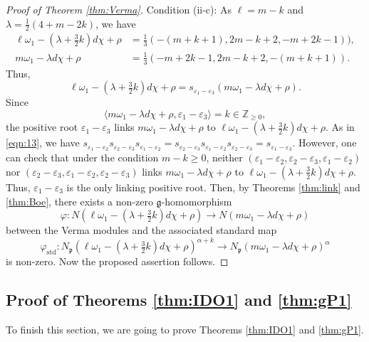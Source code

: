 \documentclass[reqno,11pt]{amsart}
\theoremstyle{remark}
\numberwithin{equation}{section}
\newcommand{\ga}{\alpha}
\newcommand{\eps}{\varepsilon}
\newcommand{\fg}{{\mathfrak g}}
\newcommand{\fp}{{\mathfrak p}}
\newcommand{\Z}{\mathbb{Z}}
\newcommand{\IP}[2]{\langle#1 , #2\rangle}     %
\newcommand{\std}{\mathrm{std}}
\begin{document}
\begin{proof}[Proof of Theorem \ref{thm:Verma}]
\noindent 
Condition (ii-c):
As
$\ell=m-k$ and $\lambda = \tfrac{1}{2}(4+m-2k)$,
we have
\begin{align*}
\ell\omega_1 -(\lambda +\tfrac{3}{2}k)d\chi+\rho 
&=
\tfrac{1}{3}(-(m+k+1), 2m-k+2, -m+2k-1)),\\
m\omega_1 -\lambda d\chi+\rho
&=\tfrac{1}{3}(-m+2k-1, 2m-k+2, -(m+k+1)).
\end{align*}
Thus,
\begin{equation*}
\ell\omega_1 -(\lambda +\tfrac{3}{2}k)d\chi+\rho 
=s_{\eps_1-\eps_3}(m\omega_1 -\lambda d\chi+\rho).
\end{equation*}
Since
\begin{equation*}
\IP{m\omega_1 -\lambda d\chi+\rho}{\eps_1-\eps_3}
=k \in \Z_{\geq 0},
\end{equation*}
the positive root $\eps_1-\eps_3$ links 
$m\omega_1 -\lambda d\chi+\rho$ to 
$\ell\omega_1 -(\lambda +\tfrac{3}{2}k)d\chi+\rho$.
As in \eqref{eqn:13},
we have 
$s_{\eps_1-\eps_2}s_{\eps_2-\eps_3}s_{\eps_1-\eps_2}
=s_{\eps_2-\eps_3}s_{\eps_1-\eps_2}s_{\eps_2-\eps_3}
=s_{\eps_1-\eps_3}$. However, one can check that under the condition $m-k \geq 0$,
neither $(\eps_1-\eps_2, \eps_2-\eps_3, \eps_1-\eps_2)$ nor 
$(\eps_2-\eps_3, \eps_1-\eps_2, \eps_2-\eps_3)$ links 
$m\omega_1 -\lambda d\chi+\rho$ to 
$\ell\omega_1 -(\lambda +\tfrac{3}{2}k)d\chi+\rho$.
Thus, $\eps_1-\eps_3$ is the only linking positive root.
Then, by Theorems \ref{thm:link} and \ref{thm:Boe}, 
there exists a non-zero $\fg$-homomorphism
\begin{equation*}
\varphi\colon
N(\ell\omega_1 -(\lambda +\tfrac{3}{2}k)d\chi+\rho)
\to
N(m\omega_1 -\lambda d\chi+\rho)
\end{equation*}
between the Verma modules and 
the associated standard map
\begin{equation*}
\varphi_{\std}\colon
N_\fp(\ell\omega_1 -(\lambda +\tfrac{3}{2}k)d\chi+\rho)^{\ga+k}
\to
N_\fp(m\omega_1 -\lambda d\chi+\rho)^\ga
\end{equation*}
is non-zero. Now the proposed assertion follows.
\end{proof}


\subsection{Proof of Theorems \ref{thm:IDO1} and \ref{thm:gP1}}\label{sec:IDOpf}
To finish this section, we are going to prove 
Theorems \ref{thm:IDO1} and \ref{thm:gP1}.
\end{document}
